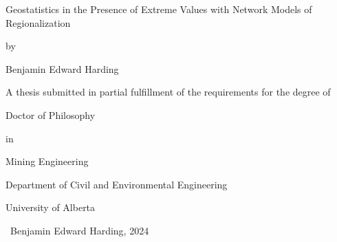 \begin{SingleSpace}

    \begin{center}
        \thispagestyle{empty}

        \vspace*{4\baselineskip}
        Geostatistics in the Presence of Extreme Values with Network Models of Regionalization
        \vspace*{1\baselineskip}

        by
        \vspace*{1\baselineskip}

        Benjamin Edward Harding
        \vspace*{6\baselineskip}

        A thesis submitted in partial fulfillment of the requirements for the degree of
        \vspace*{2\baselineskip}

        Doctor of Philosophy
        \vspace*{1\baselineskip}

        in
        \vspace*{1\baselineskip}

        Mining Engineering
        \vspace*{5\baselineskip}

        Department of Civil and Environmental Engineering

        University of Alberta
        \vspace*{10\baselineskip}

        \textcopyright\ Benjamin Edward Harding, 2024

    \end{center}

\end{SingleSpace}
